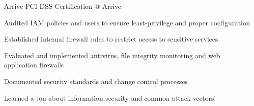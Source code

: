 
\begin{cventries}

  \cvproject
    {Arrive} %
    {PCI DSS Certification @ Arrive} %
    {} %
    {}
    {
      \begin{cvitems}  %
        \item {Audited IAM policies and users to ensure least-privilege and proper configuration}
        \item {Established internal firewall rules to restrict access to sensitive services}
        \item {Evaluated and implemented antivirus, file integrity monitoring and web application firewalls}
        \item {Documented security standards and change control processes}
        \item {Learned a ton about information security and common attack vectors!}
      \end{cvitems}
    }

\end{cventries}

